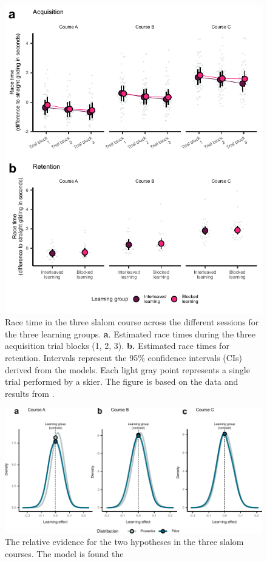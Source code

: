 \begin{figure}
    \centering
    \includegraphics[width=1\linewidth]{figure/figure_results_ci_acquisitionandretention_2.pdf}
    \caption{Race time in the three slalom course across the different sessions for the three learning groups. \textbf{a}. Estimated race times during the three acquisition trial blocks (1, 2, 3). \textbf{b.} Estimated race times for retention. Intervals represent the 95\% confidence intervals (CIs) derived from the models. Each light gray point represents a single trial performed by a skier. The figure is based on the data and results from \cite{magelssen_is_2022}.}
    \label{fig:ci_results}
\end{figure}

\begin{figure}
    \centering
    \includegraphics[width=1\linewidth]{figure/figure_results_BF_2.pdf}
    \caption{The relative evidence for the two hypotheses in the three slalom courses. The model is found the }
    \label{fig:ci_bf}
\end{figure}


